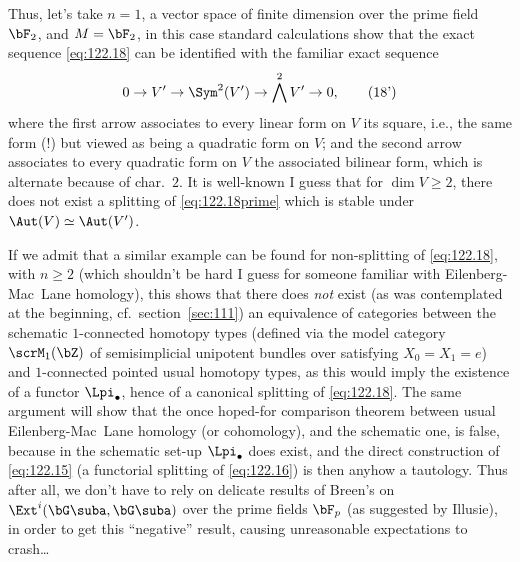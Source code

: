 Thus, let's take $n=1$, a vector space of finite dimension over the
prime field $\bF_2$, and $M=\bF_2$, in this case standard
calculations show that the exact sequence
\eqref{eq:122.18} can be identified with the familiar exact sequence
\begin{equation}
  \label{eq:122.18prime}
  0\to V'\to \Sym^2(V')\to \bigwedge^2 V'\to 0,\tag{18'}
\end{equation}
where the first arrow associates to every linear form on $V$ its
square, i.e., the same form (!) but viewed as being a quadratic form
on $V$; and the second arrow associates to every quadratic form on $V$
the associated bilinear form, which is alternate because of
char.~$2$. It is well-known I guess that for $\dim V\ge2$, there does
not exist a splitting of \eqref{eq:122.18prime} which is stable under
$\Aut(V)\simeq\Aut(V')$.

\begin{remark}
  If we admit that a similar example can be found for non-splitting of
  \eqref{eq:122.18}, with $n\ge2$ (which shouldn't be hard I guess for
  someone familiar with Eilenberg-Mac~Lane homology), this shows that
  there does \emph{not} exist (as was contemplated at the beginning,
  cf.\ section~\ref{sec:111}) an equivalence of categories between the
  schematic $1$-connected homotopy types (defined via the model
  category $\scrM_1(\bZ)$ of semisimplicial unipotent bundles over
  \bZ{} satisfying $X_0=X_1=e$) and $1$-connected pointed usual
  homotopy types, as this would imply the existence of a functor
  $\Lpi_\bullet$, hence of a canonical splitting of
  \eqref{eq:122.18}. The same argument will show that the once
  hoped-for comparison theorem between usual Eilenberg-Mac~Lane
  homology (or cohomology), and the schematic one, is false, because
  in the schematic set-up $\Lpi_\bullet$ does exist, and the direct
  construction of \eqref{eq:122.15} (a functorial splitting of
  \eqref{eq:122.16}) is then anyhow a tautology. Thus after all, we
  don't have to rely on delicate results of Breen's on
  $\Ext^i(\bG\suba,\bG\suba)$ over the prime fields $\bF_p$ (as
  suggested by Illusie), in order to get this ``negative'' result,
  causing unreasonable expectations to crash\dots
\end{remark}

\bigbreak

\presectionfill{}\par

